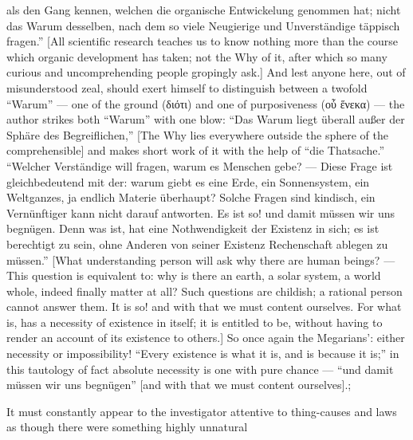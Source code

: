 \documentclass[12pt,a4paper]{book}
\begin{document}
{als den Gang kennen, welchen die organische Entwickelung genommen hat; nicht das
Warum desselben, nach dem so viele Neugierige und Unverständige täppisch
fragen.'' [All scientific research teaches us to know nothing more than the
course which organic development has taken; not the Why of it, after which so
many curious and uncomprehending people gropingly ask.] And lest anyone here, out
of misunderstood zeal, should exert himself to distinguish between a twofold
``Warum'' --- one of the ground (διότι) and one of purposiveness (οὗ ἕνεκα) ---
the author strikes both ``Warum'' with one blow: ``Das Warum liegt überall außer
der Sphäre des Begreiflichen,'' [The Why lies everywhere outside the sphere of
the comprehensible] and makes short work of it with the help of ``die
Thatsache.'' ``Welcher Verständige will fragen, warum es Menschen gebe? --- Diese
Frage ist gleichbedeutend mit der: warum giebt es eine Erde, ein Sonnensystem,
ein Weltganzes, ja endlich Materie überhaupt? Solche Fragen sind kindisch, ein
Vernünftiger kann nicht darauf antworten. Es ist so! und damit müssen wir uns
begnügen. Denn was ist, hat eine Nothwendigkeit der Existenz in sich; es ist
berechtigt zu sein, ohne Anderen von seiner Existenz Rechenschaft ablegen zu
müssen.'' [What understanding person will ask why there are human beings? ---
This question is equivalent to: why is there an earth, a solar system, a world
whole, indeed finally matter at all? Such questions are childish; a rational
person cannot answer them. It is so! and with that we must content ourselves.
For what is, has a necessity of existence in itself; it is entitled to be,
without having to render an account of its existence to others.] So once again
the Megarians': either necessity or impossibility! ``Every existence is what it
is, and is because it is;'' in this tautology of fact absolute necessity is one
with pure chance --- ``und damit müssen wir uns begnügen'' [and with that we must
content ourselves].};

It must constantly appear to the investigator attentive to thing-causes and laws
as though there were something highly unnatural
\end{document}
